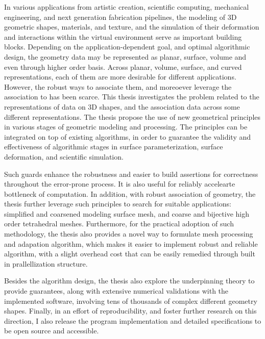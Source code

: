 

In various applications from artistic creation, scientific computing, mechanical engineering, and next generation fabrication pipelines, 
the modeling of 3D geometric shapes, materials, and texture, and the simulation of their deformation and interactions within the virtual environment serve as important building blocks.
Depending on the application-dependent goal, and optimal algorithmic design, the geometry data may be represented as planar, surface, volume and even through higher order basis.
Across planar, volume, surface, and curved representations, each of them are more desirable for different applications. However, the robust ways to associate them, and moreoever leverage the association to has been scarce.
This thesis investigates the problem related to the representations of data on 3D shapes, and the association data across some different representations. The thesis propose the use of new geometrical principles in various stages of geometric modeling and processing. The principles can be integrated on top of existing algorithms, in order to guarantee the validity and effectiveness of algorithmic stages in surface parameterization, surface deformation, and scientific simulation.

Such guards enhance the robustness and easier to build assertions for correctness throughout the error-prone process. It is also useful for reliably accelearte bottleneck of computation. 
In addition, with robust association of geometry, the thesis further leverage such principles to search for suitable applications: simplified and coarsened modeling surface mesh, and coarse and bijective high order tetrahedral meshes.
Furthermore, for the practical adoption of such methodology, the thesis also provides a novel way to formulate mesh processing and adapation algorithm, which makes it easier to implement robust and reliable algorithm, with a slight overhead cost that can be easily remedied through built in prallellization structure.

Besides the algorithm design, the thesis also explore the underpinning theory to provide guarantees, along with extensive numerical validations with the implemented software, involving tens of thousands of complex different geometry shapes. Finally, in an effort of reproducibility, and foster further research on this direction, I also release the program implementation and detailed specifications to be open source and accessible.
